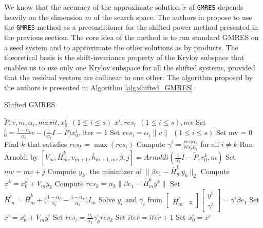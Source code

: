 \noindent We know that the accuracy of the approximate solution $\tilde x$ of \texttt{GMRES} depends heavily on the dimension $m$ of the search space. The authors in \cite{SHEN2022126799} propose to use the \texttt{GMRES} method as a preconditioner for the shifted power method presented in the previous section. The core idea of the method is to run standard GMRES on a seed system and to approximate the other solutions as by products. The theoretical basis is the shift-invariance property of the Krylov subspace that enables us to use only one Krylov subspace for all the shifted systems, provided that the residual vectors are collinear to one other. The algorithm proposed by the authors is presented in Algorithm \ref{alg:shifted_GMRES}.

\begin{algorithm}[H]
\caption{Shifted GMRES}
\label{alg:shifted_GMRES}
\begin{algorithmic}[1]
    \Require $\tilde P, v, m, \alpha_i, maxit, x_0^i ~~ (1 \leq i \leq s)$
    \Ensure $x^i, res_i ~~(1 \leq i \leq s), mv$
    \State Set $_0^i = \frac{1-\alpha_i}{\alpha_i} v - \Big(\frac{1}{\alpha_i} I - \tilde P \Big) x_0^i$, iter = 1
    \State Set $res_i = \alpha_i \lVert v \rVert ~~ (1 \leq i \leq s)$
    \State Set mv = 0
        \State Find $k$ that satisfies $res_k = \max (res_i)$
        \State Compute $\gamma^i = \frac{res_i \alpha_k}{res_k \alpha_i}$ for all $i \neq k$
        \State Run Arnoldi by $ [V_m, \bar H_m^k, v_{m+1}, \bar h_{m+1,m}, \beta, j] = Arnoldi(\frac{1}{\alpha_k}I - \tilde P, r_0^k, m)$
        \State Set $mv = mv + j$
        \State Compute $y_k$, the minimizer of $\lVert \beta e_1 - \bar H_m^k y_k \rVert_2$
        \State Compute $x^k = x_0^k + V_m y_k$
        \State Compute $res_k = \alpha_k \lVert \beta e_1 - \bar H_m^k y^k \rVert$
                \State Set $\bar H_m^i = \bar H_m^k + \Big( \frac{1-\alpha_i}{\alpha_i} - \frac{1-\alpha_k}{\alpha_k} \Big) I_m$
                \State Solve $y_i$ and $\gamma_i$ from $\begin{bmatrix} \bar H_m^i & z \end{bmatrix} \begin{bmatrix} y^i \\ \gamma^i \end{bmatrix} = \gamma^i \beta e_1$
                \State Set $x^i = x_0^i + V_m y^i$
                \State Set $res_i = \frac{\alpha_i}{\alpha_k} \gamma_k^i res_k$
            \EndIf
        \EndFor
        \State Set $iter = iter + 1$
        \State Set $x_0^i = x^i$
    \EndWhile
\end{algorithmic}
\end{algorithm}


